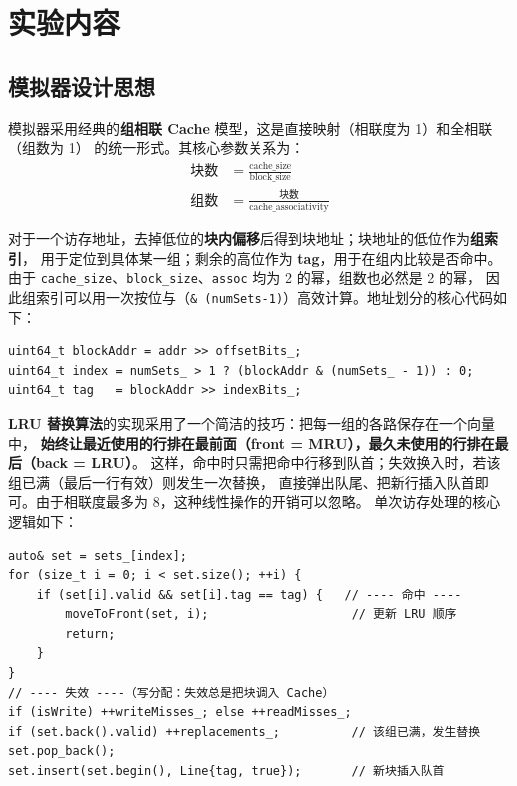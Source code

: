 \documentclass[12pt,a4paper]{ctexart}
\begin{document}
\section{实验内容}
\subsection{模拟器设计思想}
模拟器采用经典的\textbf{组相联 Cache} 模型，这是直接映射（相联度为 1）和全相联（组数为 1）
的统一形式。其核心参数关系为：
\begin{align}
\text{块数} &= \frac{\text{cache\_size}}{\text{block\_size}} \\
\text{组数} &= \frac{\text{块数}}{\text{cache\_associativity}}
\end{align}

对于一个访存地址，去掉低位的\textbf{块内偏移}后得到块地址；块地址的低位作为\textbf{组索引}，
用于定位到具体某一组；剩余的高位作为 \textbf{tag}，用于在组内比较是否命中。由于
\texttt{cache\_size}、\texttt{block\_size}、\texttt{assoc} 均为 2 的幂，组数也必然是 2 的幂，
因此组索引可以用一次按位与（\texttt{\& (numSets-1)}）高效计算。地址划分的核心代码如下：
\begin{lstlisting}
uint64_t blockAddr = addr >> offsetBits_;
uint64_t index = numSets_ > 1 ? (blockAddr & (numSets_ - 1)) : 0;
uint64_t tag   = blockAddr >> indexBits_;
\end{lstlisting}

\textbf{LRU 替换算法}的实现采用了一个简洁的技巧：把每一组的各路保存在一个向量中，
\textbf{始终让最近使用的行排在最前面（front = MRU），最久未使用的行排在最后（back = LRU）}。
这样，命中时只需把命中行移到队首；失效换入时，若该组已满（最后一行有效）则发生一次替换，
直接弹出队尾、把新行插入队首即可。由于相联度最多为 8，这种线性操作的开销可以忽略。
单次访存处理的核心逻辑如下：
\begin{lstlisting}
auto& set = sets_[index];
for (size_t i = 0; i < set.size(); ++i) {
    if (set[i].valid && set[i].tag == tag) {   // ---- 命中 ----
        moveToFront(set, i);                    // 更新 LRU 顺序
        return;
    }
}
// ---- 失效 ----（写分配：失效总是把块调入 Cache）
if (isWrite) ++writeMisses_; else ++readMisses_;
if (set.back().valid) ++replacements_;          // 该组已满，发生替换
set.pop_back();
set.insert(set.begin(), Line{tag, true});       // 新块插入队首
\end{lstlisting}
\end{document}
